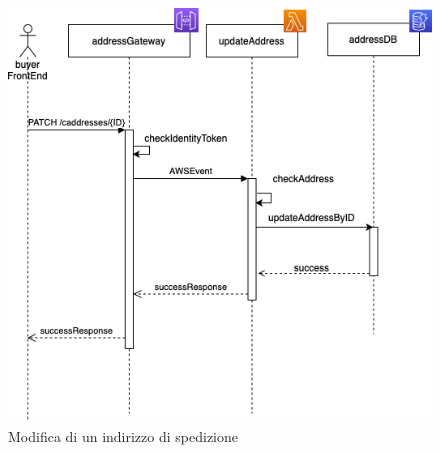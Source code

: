 \begin{figure}[H]
	\centering
	\includegraphics[scale=0.5]{Immagini/Backend/ModificaIndirizzo.png}
	\caption{Modifica di un indirizzo di spedizione}
	\label{fig:DiagrammaModificaindirizzo}
\end{figure}